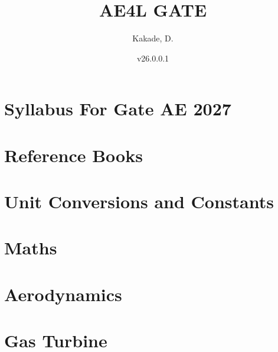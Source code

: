 \documentclass{book}
\title{AE4L GATE}
\author{Kakade, D.}
\date{v26.0.0.1}
\begin{document}
\begin{titlepage}
  \maketitle

\end{titlepage}


\clearpage
\tableofcontents
\listoftables
\listoffigures
\clearpage

\chapter{Syllabus For Gate AE 2027}



\chapter{Reference Books}



\chapter{Unit Conversions and Constants}



\chapter{Maths}



\chapter{Aerodynamics}



\chapter{Gas Turbine}


\end{document}
